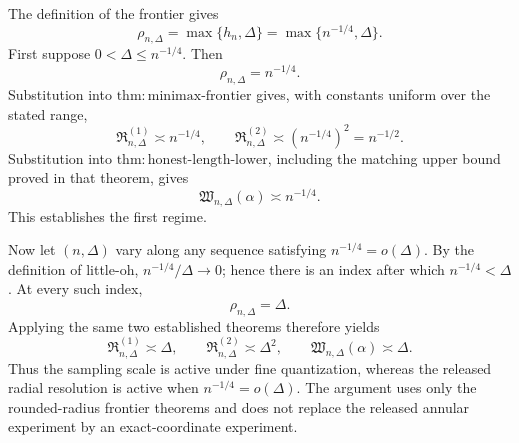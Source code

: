 The definition of the frontier gives
\[
 \rho_{n,\Delta}=\max\{h_n,\Delta\}
 =\max\{n^{-1/4},\Delta\}.
\]
First suppose \(0<\Delta\leq n^{-1/4}\).  Then
\[
 \rho_{n,\Delta}=n^{-1/4}.
\]
Substitution into \(\mathrm{thm:minimax\text{-}frontier}\) gives, with constants uniform over the stated range,
\[
 \mathfrak R^{(1)}_{n,\Delta}\asymp n^{-1/4},
 \qquad
 \mathfrak R^{(2)}_{n,\Delta}
 \asymp (n^{-1/4})^2=n^{-1/2}.
\]
Substitution into \(\mathrm{thm:honest\text{-}length\text{-}lower}\), including the matching upper bound proved in that theorem, gives
\[
 \mathfrak W_{n,\Delta}(\alpha)\asymp n^{-1/4}.
\]
This establishes the first regime.

Now let \((n,\Delta)\) vary along any sequence satisfying \(n^{-1/4}=o(\Delta)\).  By the definition of little-oh, \(n^{-1/4}/\Delta\to0\); hence there is an index after which \(n^{-1/4}<\Delta\).  At every such index,
\[
 \rho_{n,\Delta}=\Delta.
\]
Applying the same two established theorems therefore yields
\[
 \mathfrak R^{(1)}_{n,\Delta}\asymp\Delta,
 \qquad
 \mathfrak R^{(2)}_{n,\Delta}\asymp\Delta^2,
 \qquad
 \mathfrak W_{n,\Delta}(\alpha)\asymp\Delta.
\]
Thus the sampling scale is active under fine quantization, whereas the released radial resolution is active when \(n^{-1/4}=o(\Delta)\).  The argument uses only the rounded-radius frontier theorems and does not replace the released annular experiment by an exact-coordinate experiment.